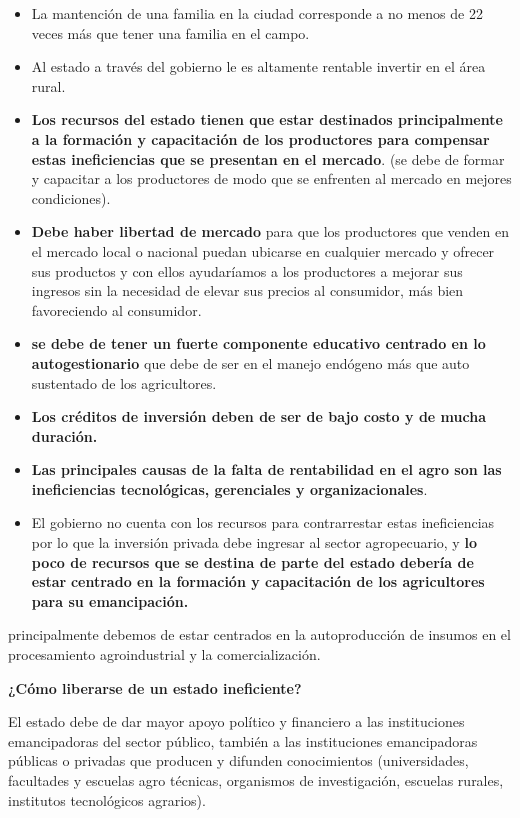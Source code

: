 \documentclass[
  a4paper,
]{article}
\begin{document}
\begin{itemize}
\item
  La mantención de una familia en la ciudad corresponde a no menos de 22
  veces más que tener una familia en el campo.
\item
  Al estado a través del gobierno le es altamente rentable invertir en
  el área rural.
\item
  \textbf{Los recursos del estado tienen que estar destinados
  principalmente a la formación y capacitación de los productores para
  compensar estas ineficiencias que se presentan en el mercado}. (se
  debe de formar y capacitar a los productores de modo que se enfrenten
  al mercado en mejores condiciones).
\item
  \textbf{Debe haber libertad de mercado} para que los productores que
  venden en el mercado local o nacional puedan ubicarse en cualquier
  mercado y ofrecer sus productos y con ellos ayudaríamos a los
  productores a mejorar sus ingresos sin la necesidad de elevar sus
  precios al consumidor, más bien favoreciendo al consumidor.
\item
  \textbf{se debe de tener un fuerte componente educativo centrado en lo
  autogestionario} que debe de ser en el manejo endógeno más que auto
  sustentado de los agricultores.
\item
  \textbf{Los créditos de inversión deben de ser de bajo costo y de
  mucha duración.}
\item
  \textbf{Las principales causas de la falta de rentabilidad en el agro
  son las ineficiencias tecnológicas, gerenciales y organizacionales}.
\item
  El gobierno no cuenta con los recursos para contrarrestar estas
  ineficiencias por lo que la inversión privada debe ingresar al sector
  agropecuario, y \textbf{lo poco de recursos que se destina de parte
  del estado debería de estar} \textbf{centrado en la formación y
  capacitación de los agricultores para su emancipación.}
\end{itemize}

principalmente debemos de estar centrados en la autoproducción de
insumos en el procesamiento agroindustrial y la comercialización.

\textbf{¿Cómo liberarse de un estado ineficiente?}

El estado debe de dar mayor apoyo político y financiero a las
instituciones emancipadoras del sector público, también a las
instituciones emancipadoras públicas o privadas que producen y difunden
conocimientos (universidades, facultades y escuelas agro técnicas,
organismos de investigación, escuelas rurales, institutos tecnológicos
agrarios).
\end{document}
